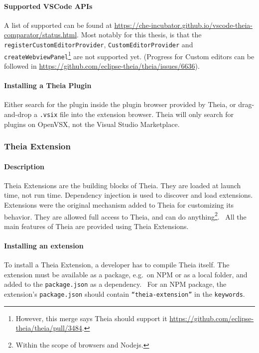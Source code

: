 \paragraph*{Supported VSCode APIs}
A list of supported  can be found at \href{https://che-incubator.github.io/vscode-theia-comparator/status.html}{https://che-incubator.github.io/vscode-theia-comparator/status.html}.
Most notably for this thesis, is that the \texttt{registerCustomEditorProvider}, \texttt{CustomEditorProvider} and \texttt{createWebviewPanel}\footnote{However, this merge says Theia should support it \href{https://github.com/eclipse-theia/theia/pull/3484}{https://github.com/eclipse-theia/theia/pull/3484}.} are not supported yet.
(Progress for Custom editors can be followed in \href{https://github.com/eclipse-theia/theia/issues/6636}{https://github.com/eclipse-theia/theia/issues/6636}).

\paragraph*{Installing a Theia Plugin}
Either search for the plugin inside the plugin browser provided by \gls{Theia},
or drag-and-drop a \texttt{.vsix} file into the extension browser.
Theia will only search for plugins on OpenVSX, not the Visual Studio Marketplace.



\subsubsection{Theia Extension}\label{sec:theia-extension}

\paragraph*{Description}
\Gls{Theia} Extensions are the building blocks of Theia.
They are loaded at launch time, not run time.
Dependency injection is used to discover and load extensions.
Extensions were the original mechanism added to Theia for customizing its behavior.
They are allowed full access to Theia, and can do anything\footnote{Within the scope of browsers and \gls{Nodejs}.}.~\cite{helmingEclipseTheiaExtensions2019,helmingEclipseTheiaIDE2019a}
All the main features of Theia are provided using Theia Extensions.

\paragraph*{Installing an extension}
To install a Theia Extension, a developer has to compile Theia itself.
The extension must be available as a package, e.g.\ on \gls{NPM} or as a local folder, and added to the \texttt{package.json} as a dependency.~\cite{helmingHowAddExtensions2019}
For an \gls{NPM} package, the extension's \texttt{package.json} should contain \texttt{``theia-extension''} in the \texttt{keywords}.~\cite{typefoxAuthoringTheiaExtensions}


